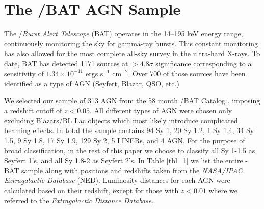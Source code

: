 \section{The \swift/BAT AGN Sample}\label{sample}
The  \swift/\textit{Burst Alert Telescope} (BAT) \cite{Barthelmy_2005,Gehrels_2004} operates in the 14--195 keV energy range, continuously monitoring the sky for gamma-ray bursts. This constant monitoring has also allowed for the most complete \href{https://swift.gsfc.nasa.gov/results/bs70mon/}{all-sky survey} in the ultra-hard X-rays. To date, BAT has detected 1171 sources at  $>4.8\sigma$ significance corresponding to a sensitivity of $1.34\times10^{-11}$ ergs s$^{-1}$ cm$^{-2}$. Over 700 of those sources have been identified as a type of AGN (Seyfert, Blazar, QSO, etc.)

We selected our sample of 313 AGN from the 58 month \swift/BAT Catalog \citep{Baumgartner:2012gf}, imposing a redshift cutoff of $z<0.05$. All different types of AGN were chosen only excluding Blazars/BL Lac objects which most likely introduce complicated beaming effects. In total the sample contains 94 Sy 1, 20 Sy 1.2, 1 Sy 1.4, 34 Sy 1.5, 9 Sy 1.8, 17 Sy 1.9, 129 Sy 2, 5 LINERs, and 4 AGN. For the purpose of broad classification, in the rest of this paper we choose to classify all Sy 1-1.5 as Seyfert 1's, and all Sy 1.8-2 as Seyfert 2's. In Table \ref{tbl_1} we list the entire \herschel{}-BAT sample along with positions and redshifts taken from the \href{http://ned.ipac.caltech.edu/}{\textit{NASA/IPAC Extragalactic Database} (NED)}. Luminosity distances for each AGN were calculated based on their redshift, except for those with $z < 0.01$ where we referred to the \href{http://edd.ifa.hawaii.edu/]}{\textit{Extragalactic Distance Database}}.